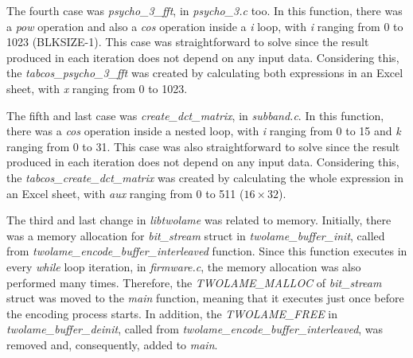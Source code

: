 \begin{comment}
\begin{figure}[H]
\centerline{\fbox{\texttt{[image: spl.pdf]}}}
\caption{\textit{psycho\_3\_spl} function.}
\label{spl}
\end{figure}

\vspace{1cm}
\end{comment}

The fourth case was \textit{psycho\_3\_fft}, in \textit{psycho\_3.c} too. In this function, there was a \textit{pow} operation and also a \textit{cos} operation inside a \textit{i} loop, with \textit{i} ranging from 0 to 1023 (BLKSIZE-1). This case was straightforward to solve since the result produced in each iteration does not depend on any input data. Considering this, the \textit{tabcos\_psycho\_3\_fft} was created by calculating both expressions in an Excel sheet, with \textit{x} ranging from 0 to 1023.

\begin{comment}
\begin{figure}[H]
\centerline{\texttt{[image: fft.pdf]}}
\caption{\textit{psycho\_3\_fft} function.}
\label{fft}
\end{figure}

\vspace{1cm}
\end{comment}

The fifth and last case was \textit{create\_dct\_matrix}, in \textit{subband.c}. In this function, there was a \textit{cos} operation inside a nested loop, with \textit{i} ranging from 0 to 15 and \textit{k} ranging from 0 to 31. This case was also straightforward to solve since the result produced in each iteration does not depend on any input data. Considering this, the \textit{tabcos\_create\_dct\_matrix} was created by calculating the whole expression in an Excel sheet, with \textit{aux} ranging from 0 to 511 ($16 \times 32$).

\begin{comment}
\begin{figure}[H]
\centerline{\fbox{\texttt{[image: dct.pdf]}}}
\caption{\textit{create\_dct\_matrix} function.}
\label{dct}
\end{figure}

\vspace{1cm}
\end{comment}

The third and last change in \textit{libtwolame} was related to memory.
Initially, there was a memory allocation for \textit{bit\_stream} struct in \textit{twolame\_buffer\_init}, called from \textit{twolame\_encode\_buffer\_interleaved} function. Since this function executes in every \textit{while} loop iteration, in \textit{firmware.c}, the memory allocation was also performed many times.
Therefore, the \textit{TWOLAME\_MALLOC} of \textit{bit\_stream} struct was moved to the \textit{main} function, meaning that it executes just once before the encoding process starts.
In addition, the \textit{TWOLAME\_FREE} in \textit{twolame\_buffer\_deinit}, called from \textit{twolame\_encode\_buffer\_interleaved}, was removed and, consequently, added to \textit{main}.

